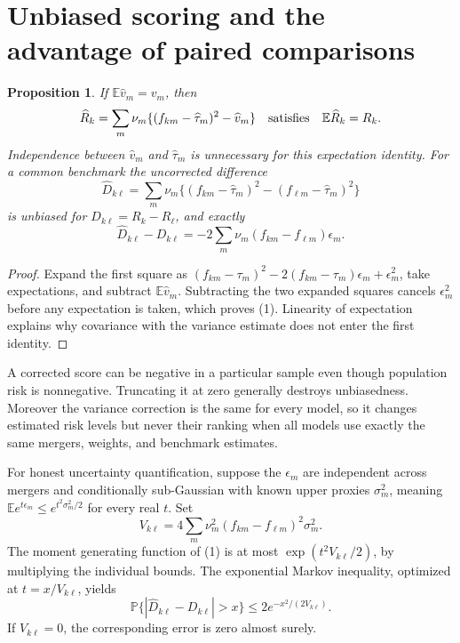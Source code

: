 \documentclass[11pt,a4paper]{article}
\newtheorem{proposition}[theorem]{Proposition}
\newcommand{\E}{\mathbb E}
\newcommand{\Prob}{\mathbb P}
\begin{document}
\section{Unbiased scoring and the advantage of paired comparisons}
\begin{proposition}
If $\E\widehat v_m=v_m$, then
\[
 \widehat R_k=\sum_m\nu_m
       \{(f_{km}-\widehat\tau_m)^2-\widehat v_m\}
 \quad\hbox{satisfies}\quad \E\widehat R_k=R_k.
\]
Independence between $\widehat v_m$ and $\widehat\tau_m$ is unnecessary for this
expectation identity. For a common benchmark the uncorrected difference
\[
 \widehat D_{k\ell}=\sum_m\nu_m
   \{(f_{km}-\widehat\tau_m)^2-(f_{\ell m}-\widehat\tau_m)^2\}
\]
is unbiased for $D_{k\ell}=R_k-R_\ell$, and exactly
\[
 \widehat D_{k\ell}-D_{k\ell}
       =-2\sum_m\nu_m(f_{km}-f_{\ell m})\epsilon_m.             \tag{1}
\]
\end{proposition}
\begin{proof}
Expand the first square as
$(f_{km}-\tau_m)^2-2(f_{km}-\tau_m)\epsilon_m+\epsilon_m^2$,
take expectations, and subtract $\E\widehat v_m$. Subtracting the two
expanded squares cancels $\epsilon_m^2$ before any expectation is taken,
which proves (1). Linearity of expectation explains why covariance with the
variance estimate does not enter the first identity.
\end{proof}
A corrected score can be negative in a particular sample even though population
risk is nonnegative. Truncating it at zero generally destroys unbiasedness.
Moreover the variance correction is the same for every model, so it changes
estimated risk levels but never their ranking when all models use exactly the
same mergers, weights, and benchmark estimates.

For honest uncertainty quantification, suppose the $\epsilon_m$ are independent
across mergers and conditionally sub-Gaussian with known upper proxies
$\sigma_m^2$, meaning
$\E e^{t\epsilon_m}\leq e^{t^2\sigma_m^2/2}$ for every real $t$.
Set
\[
 V_{k\ell}=4\sum_m\nu_m^2(f_{km}-f_{\ell m})^2\sigma_m^2.
\]
The moment generating function of (1) is at most
$\exp(t^2V_{k\ell}/2)$, by multiplying the individual bounds.
The exponential Markov inequality, optimized at $t=x/V_{k\ell}$, yields
\[
 \Prob\{|\widehat D_{k\ell}-D_{k\ell}|>x\}
       \leq 2e^{-x^2/(2V_{k\ell})}.                          \tag{2}
\]
If $V_{k\ell}=0$, the corresponding error is zero almost surely.
\end{document}

